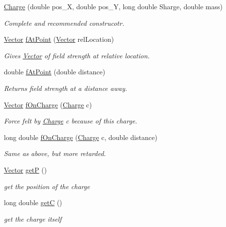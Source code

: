 \begin{DoxyCompactItemize}
\hyperlink{classCharge_a861a7952544ef4aec60ccf5bb9bc0d1e}{Charge} (double pos\-\_\-\-X, double pos\-\_\-\-Y, long double Sharge, double mass)
\begin{DoxyCompactList}\small\item\em Complete and recommended construcotr. \end{DoxyCompactList}\item 
\hyperlink{classVector}{Vector} \hyperlink{classCharge_a57fc811d1cd5e82db047f632738590d3}{f\-At\-Point} (\hyperlink{classVector}{Vector} rel\-Location)
\begin{DoxyCompactList}\small\item\em Gives \hyperlink{classVector}{Vector} of field strength at relative location. \end{DoxyCompactList}\item 
double \hyperlink{classCharge_ae39556053dfc51bf20b75f8d71999d1c}{f\-At\-Point} (double distance)
\begin{DoxyCompactList}\small\item\em Returns field strength at a distance away. \end{DoxyCompactList}\item 
\hyperlink{classVector}{Vector} \hyperlink{classCharge_a5719d9064d038750844b155b85e72115}{f\-On\-Charge} (\hyperlink{classCharge}{Charge} c)
\begin{DoxyCompactList}\small\item\em Force felt by \hyperlink{classCharge}{Charge} c because of this charge. \end{DoxyCompactList}\item 
long double \hyperlink{classCharge_a9b0819f817e84bd923fb3b00a716b7ce}{f\-On\-Charge} (\hyperlink{classCharge}{Charge} c, double distance)
\begin{DoxyCompactList}\small\item\em Same as above, but more retarded. \end{DoxyCompactList}\item 
\hyperlink{classVector}{Vector} \hyperlink{classCharge_ac9f69cff106d8770df4bc4a22d61970f}{get\-P} ()
\begin{DoxyCompactList}\small\item\em get the position of the charge \end{DoxyCompactList}\item 
long double \hyperlink{classCharge_a7761fa3f86ecd3c28986218437986a2e}{get\-C} ()
\begin{DoxyCompactList}\small\item\em get the charge itself \end{DoxyCompactList}\item 

\end{DoxyCompactItemize}
